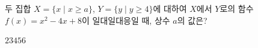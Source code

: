 \hspace*{2mm}\begin{minipage}[t]{\dimexpr\linewidth-2mm\relax}\vspace{0pt}
두 집합 $X=\{x\mid x\ge a\}$, $Y=\{y\mid y\ge 4\}$에 대하여 $X$에서 $Y$로의 함수 $f(x)=x^2-4x+8$이 일대일대응일 때, 상수 $a$의 값은?
\begin{choices32}{$2$}{$3$}{$4$}{$5$}{$6$}\end{choices32}\end{minipage}
